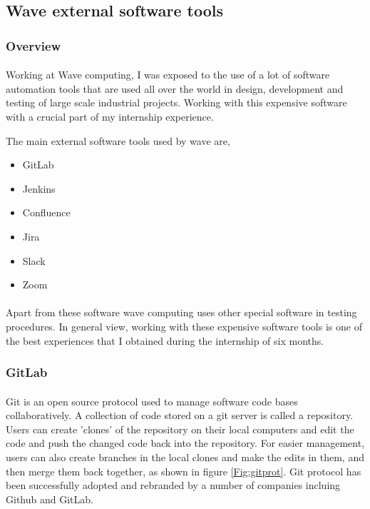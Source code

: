 
\newpage
\subsection{Wave external software tools}
\label{sec:swtools}
\subsubsection{Overview}
\paragraph{}
Working at Wave computing, I was exposed to the use of a lot of software automation tools that are used all over the world in design, development and testing of large scale industrial projects. Working with this expensive software with a crucial part of my internship experience.

The main external software tools used by wave are,
\begin{itemize}
    \item GitLab
    \item Jenkins
    \item Confluence
    \item Jira
    \item Slack
    \item Zoom
\end{itemize}

\paragraph{}
Apart from these software wave computing uses other special software in testing procedures. In general view, working with these expensive software tools is one of the best experiences that I obtained during the internship of six months.

\subsubsection{GitLab}
\paragraph{}
Git is an open source protocol used to manage software code bases collaboratively. A collection of code stored on a git server is called a repository. Users can create 'clones' of the repository on their local computers and edit the code and push the changed code back into the repository. For easier management, users can also create branches in the local clones and make the edits in them, and then merge them back together, as shown in figure \ref{Fig:gitprot}. Git protocol has been successfully adopted and rebranded by a number of companies incluing Github and GitLab.

